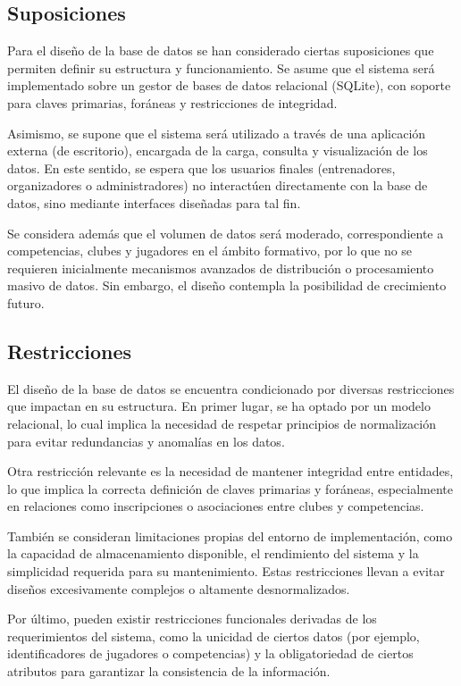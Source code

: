\subsection{Suposiciones}

Para el diseño de la base de datos se han considerado ciertas suposiciones que permiten definir su estructura y funcionamiento. Se asume que el sistema será implementado sobre un  gestor de bases de datos relacional (SQLite), con soporte para claves primarias, foráneas y restricciones de integridad.

Asimismo, se supone que el sistema será utilizado a través de una aplicación externa (de escritorio), encargada de la carga, consulta y visualización de los datos. En este sentido, se espera que los usuarios finales (entrenadores, organizadores o administradores) no interactúen directamente con la base de datos, sino mediante interfaces diseñadas para tal fin.

Se considera además que el volumen de datos será moderado, correspondiente a competencias, clubes y jugadores en el ámbito formativo, por lo que no se requieren inicialmente mecanismos avanzados de distribución o procesamiento masivo de datos. Sin embargo, el diseño contempla la posibilidad de crecimiento futuro.

\subsection{Restricciones}

El diseño de la base de datos se encuentra condicionado por diversas restricciones que impactan en su estructura. En primer lugar, se ha optado por un modelo relacional, lo cual implica la necesidad de respetar principios de normalización para evitar redundancias y anomalías en los datos.

Otra restricción relevante es la necesidad de mantener integridad entre entidades, lo que implica la correcta definición de claves primarias y foráneas, especialmente en relaciones como inscripciones o asociaciones entre clubes y competencias.

También se consideran limitaciones propias del entorno de implementación, como la capacidad de almacenamiento disponible, el rendimiento del sistema y la simplicidad requerida para su mantenimiento. Estas restricciones llevan a evitar diseños excesivamente complejos o altamente desnormalizados.

Por último, pueden existir restricciones funcionales derivadas de los requerimientos del sistema, como la unicidad de ciertos datos (por ejemplo, identificadores de jugadores o competencias) y la obligatoriedad de ciertos atributos para garantizar la consistencia de la información.

